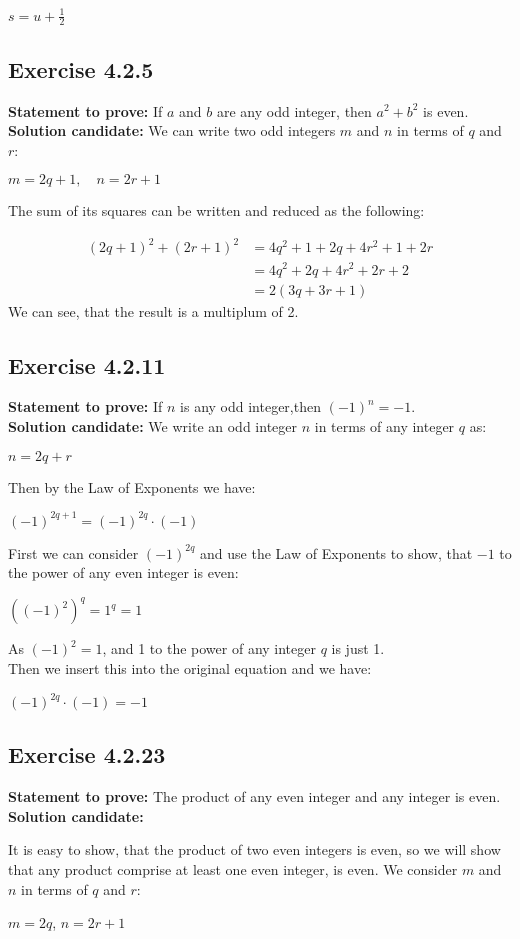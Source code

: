 \documentclass{report}
\newcommand{\cent}[1]{\begin{center}#1\end{center}}
\newcommand{\mAlign}[1]{\begin{align*}#1\end{align*}}
\newcommand{\Prove}{\textbf{Statement to prove: }}
\newcommand{\solution}{\textbf{Solution candidate: }}
\newcommand{\QED}{\boxed{}}
\newcommand{\Exercise}[1]{\subsection{Exercise #1}}
\begin{document}
	\cent{$s=u+\frac{1}{2}$}
	
	\QED
	
	\Exercise{4.2.5}
	\Prove
	If $a$ and $b$ are any odd integer, then $a^2 + b^2$ is even.\\
	
	\solution
	We can write two odd integers $m$ and $n$ in terms of $q$ and $r$:
	\cent{$m = 2q+1, \quad n = 2r+1$}
	
	The sum of its squares can be written and reduced as the following:
	
	\mAlign{(2q+1)^2 + (2r+1)^2 &= 4q^2 + 1 + 2q + 4r^2 + 1 +2r \\
					&= 4q^2+2q + 4r^2 + 2r +2 \\
					&= 2(3q +3r +1)}
	We can see, that the result is a multiplum of 2.\\
	\QED
	
	\Exercise{4.2.11}
	
	\Prove
	If $n$ is any odd integer,then $(-1)^n = -1$.\\
	
	\solution
	We write an odd integer $n$ in terms of any integer $q$ as:
	
	\cent{$n = 2q+r$}
	
	Then by the Law of Exponents we have:
	
	\cent{$(-1)^{2q + 1} = (-1)^{2q} \cdot (-1)$}
	
	First we can consider $(-1)^{2q}$ and use the Law of Exponents to show, that $-1$ to the power of any even integer is even:
	
	\cent{$((-1)^2)^q = 1^q = 1$}
	
	As $(-1)^2 = 1$, and 1 to the power of any integer $q$ is just 1.\\
	
	Then we insert this into the original equation and we have:
	
	\cent{$(-1)^{2q} \cdot (-1) = -1$}
	
	\QED
	
	\Exercise{4.2.23}
	
	\Prove
	The product of any even integer and any integer is even.\\
	
	\solution
	
	It is easy to show, that the product of two even integers is even, so we will show that any product comprise at least one even integer, is even. We consider $m$ and $n$ in terms of $q$ and $r$:
	
	\cent{$m = 2q$, \quad $n = 2r+1$}
	
\end{document}
